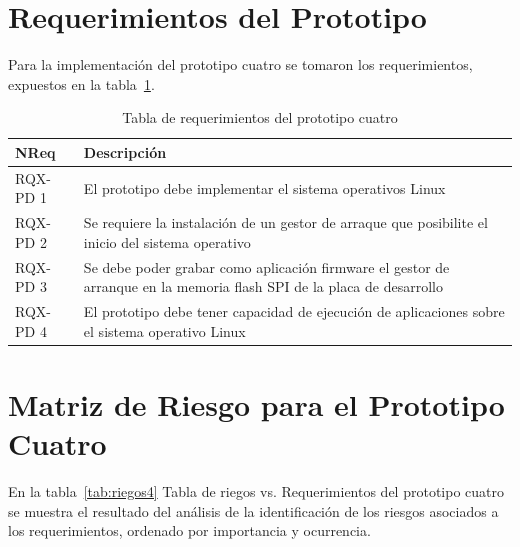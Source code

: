 		\section{Requerimientos del Prototipo}
Para la implementación del prototipo cuatro se tomaron los requerimientos, expuestos en la tabla~\ref{tab:tdr4}.		

		\begin{table}[h!]
		\centering	
		\begin{tabular}{ p{2.5cm} p{14.5cm} }
		\hline 
		\rowcolor[gray]{0.8} N\textordmasculine Req  & Descripción\\
		\hline                             	RQX-PD 1 & El prototipo debe implementar el sistema operativos Linux\\ 
		\hline  						RQX-PD 2 & Se requiere la instalación de un gestor de arraque que posibilite el inicio del sistema operativo\\ 
		\hline 						RQX-PD 3 & Se debe poder grabar como aplicación firmware el gestor de arranque en la memoria flash SPI de la placa de desarrollo\\
		\hline 						RQX-PD 4 & El prototipo debe tener capacidad de ejecución de aplicaciones sobre el sistema operativo Linux\\
		\hline 
		\end{tabular}
		\caption{Tabla de requerimientos del prototipo cuatro}
		\label{tab:tdr4}
		\end{table}
		
		\newpage
		\section{Matriz de Riesgo para el Prototipo Cuatro} 
En la tabla~\ref{tab:riegos4} Tabla de riegos vs. Requerimientos del prototipo cuatro se muestra el resultado del análisis de la identificación de los riesgos asociados a los requerimientos, ordenado por importancia y ocurrencia.


